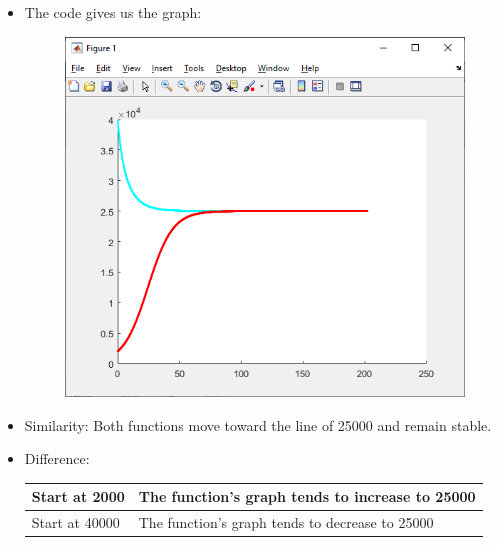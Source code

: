 \documentclass[12pt,en,a4paper]{article}
\begin{document}
	\begin{itemize}
		\item The code gives us the graph:
		\begin{figure}[h]
			\centering
			\includegraphics[scale=0.35]{3.png}
			\label{fig:mesh1}
		\end{figure}
		\item Similarity: Both functions move toward the line of 25000 and remain stable.
		\item Difference:
		\begin{table}[H]
			\centering
			\begin{tabular}{|l|l|}
				\hline
				Start at 2000 & The function’s graph tends to increase to 25000 \\ \hline
				Start at 40000 & The function’s graph tends to decrease to 25000 \\ \hline
			\end{tabular}
		\end{table}
	\end{itemize}
\end{document}
